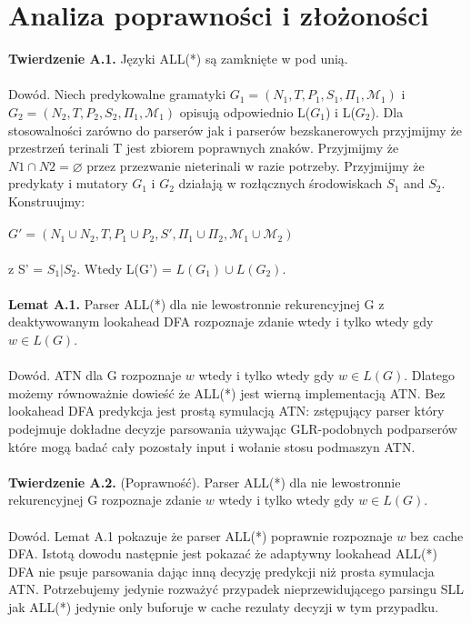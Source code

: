﻿\section{Analiza poprawności i złożoności}
\textbf{Twierdzenie A.1.} Języki ALL(*) są zamknięte w pod unią.
\\ \\
Dowód. Niech predykowalne gramatyki $G_1 = (N_1, T, P_1, S_1, \Pi_1,\mathcal{M}_1)$
i $G_2 = (N_2, T, P_2, S_2, \Pi_1,\mathcal{M}_1)$ opisują odpowiednio L($G_1$) i L($G_2$).
Dla stosowalności zarówno do parserów jak i parserów bezskanerowych
przyjmijmy że przestrzeń terinali T jest zbiorem poprawnych znaków.
Przyjmijmy że  $N1 \cap N2 = \varnothing$ przez przezwanie nieterinali
w razie potrzeby.
Przyjmijmy że predykaty i mutatory $G_1$ i
$G_2$ działają w rozłącznych środowiskach $S_1$ and $S_2$.
Konstruujmy:
\\ \\
$G' = (N_1 \cup N_2, T, P_1 \cup P_2, S',\Pi_1 \cup \Pi_2,\mathcal{M}_1 \cup \mathcal{M}_2)$
\\ \\
z S' = $S_1 | S_2$. Wtedy L(G') = $L(G_1) \cup L(G_2)$.
\\ \\
\textbf{Lemat A.1.} Parser ALL(*) dla nie lewostronnie rekurencyjnej G z
deaktywowanym lookahead DFA rozpoznaje zdanie wtedy i tylko wtedy gdy  $w \in L(G)$.
\\ \\
Dowód. ATN dla G rozpoznaje $w$ wtedy i tylko wtedy gdy $w \in L(G)$.
Dlatego możemy równoważnie dowieść że ALL(*) jest
wierną implementacją ATN. Bez lookahead DFA predykcja jest
prostą symulacją ATN: zstępujący parser który podejmuje
dokładne decyzje parsowania używając GLR-podobnych podparserów które
mogą badać cały pozostały input i wołanie stosu podmaszyn ATN.
\\ \\
\textbf{Twierdzenie A.2.} (Poprawność). Parser ALL(*) dla nie lewostronnie
rekurencyjnej G rozpoznaje zdanie $w$ wtedy i tylko wtedy gdy $w \in L(G)$.
\\ \\
Dowód. Lemat A.1 pokazuje że parser ALL(*) poprawnie rozpoznaje
$w$ bez cache DFA. Istotą dowodu
następnie jest pokazać że adaptywny lookahead ALL(*) DFA nie
psuje parsowania dając inną decyzję predykcji niż
prosta symulacja ATN. Potrzebujemy jedynie rozważyć
przypadek nieprzewidującego parsingu SLL jak ALL(*)
jedynie only buforuje w cache rezulaty decyzji w tym przypadku.
\par
